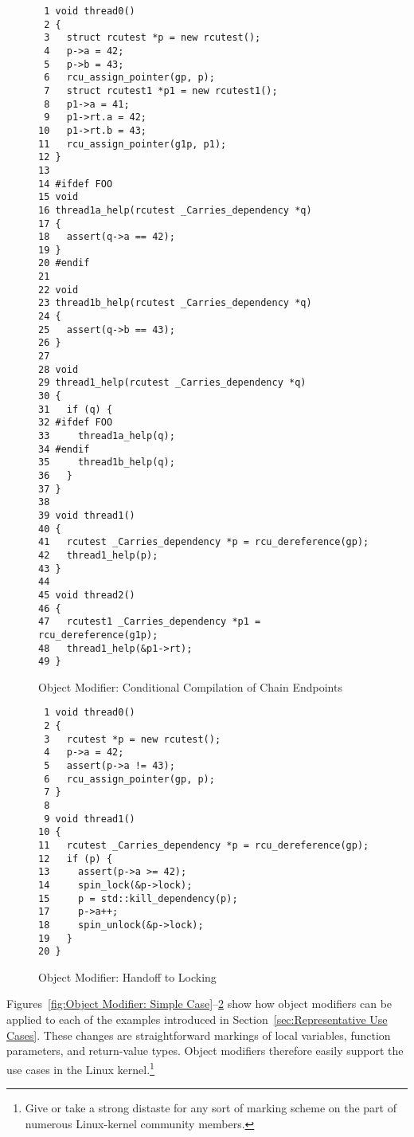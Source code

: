 \begin{figure}[tbp]
{ \scriptsize
\begin{verbatim}
 1 void thread0()
 2 {
 3   struct rcutest *p = new rcutest();
 4   p->a = 42;
 5   p->b = 43;
 6   rcu_assign_pointer(gp, p);
 7   struct rcutest1 *p1 = new rcutest1();
 8   p1->a = 41;
 9   p1->rt.a = 42;
10   p1->rt.b = 43;
11   rcu_assign_pointer(g1p, p1);
12 }
13
14 #ifdef FOO
15 void
16 thread1a_help(rcutest _Carries_dependency *q)
17 {
18   assert(q->a == 42);
19 }
20 #endif
21
22 void
23 thread1b_help(rcutest _Carries_dependency *q)
24 {
25   assert(q->b == 43);
26 }
27
28 void
29 thread1_help(rcutest _Carries_dependency *q)
30 {
31   if (q) {
32 #ifdef FOO
33     thread1a_help(q);
34 #endif
35     thread1b_help(q);
36   }
37 }
38
39 void thread1()
40 {
41   rcutest _Carries_dependency *p = rcu_dereference(gp);
42   thread1_help(p);
43 }
44
45 void thread2()
46 {
47   rcutest1 _Carries_dependency *p1 = rcu_dereference(g1p);
48   thread1_help(&p1->rt);
49 }
\end{verbatim}
}
\caption{Object Modifier: Conditional Compilation of Chain Endpoints}
\label{fig:Object Modifier: Conditional Compilation of Chain Endpoints}
\end{figure}

\begin{figure}[tbp]
{ \scriptsize
\begin{verbatim}
 1 void thread0()
 2 {
 3   rcutest *p = new rcutest();
 4   p->a = 42;
 5   assert(p->a != 43);
 6   rcu_assign_pointer(gp, p);
 7 }
 8
 9 void thread1()
10 {
11   rcutest _Carries_dependency *p = rcu_dereference(gp);
12   if (p) {
13     assert(p->a >= 42);
14     spin_lock(&p->lock);
15     p = std::kill_dependency(p);
17     p->a++;
18     spin_unlock(&p->lock);
19   }
20 }
\end{verbatim}
}
\caption{Object Modifier: Handoff to Locking}
\label{fig:Object Modifier: Handoff to Locking}
\end{figure}

Figures~\ref{fig:Object Modifier: Simple Case}--\ref{fig:Object Modifier: Handoff to Locking}
show how object modifiers can be applied to each of the examples
introduced in Section~\ref{sec:Representative Use Cases}.
These changes are straightforward markings of local variables, function
parameters, and return-value types.
Object modifiers therefore easily support the use cases in the Linux
kernel.\footnote{
	Give or take a strong distaste for any sort of marking scheme
	on the part of numerous Linux-kernel community members.}
